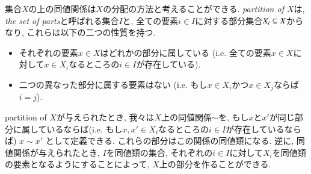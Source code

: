 \begin{example}[Partitions]\label{ex:partition}



集合$X$の上の同値関係は$X$の分配の方法と考えることができる. \emph{partition of $X$}は, \emph{the set of parts}と呼ばれる集合$I$と, 全ての要素$i\in I$に対する部分集合$X_i\ss X$からなり, これらは以下の二つの性質を持つ.
\begin{itemize}
\item それぞれの要素$x\in X$はどれかの部分に属している (i.e. 全ての要素$x\in X$に対して$x\in X_i$なるところの$i\in I$が存在している).
\item 二つの異なった部分に属する要素はない (i.e. もし$x\in X_i$かつ$x\in X_j$ならば$i=j$).
\end{itemize}

partition of $X$が与えられたとき, 我々は$X$上の同値関係$\sim$を, もし$x$と$x'$が同じ部分に属しているならば(i.e. もし$x,x'\in X_i$なるところの$i\in I$が存在しているならば) $x\sim x'$ として定義できる. これらの部分はこの関係の同値類になる. 逆に, 同値関係が与えられたとき, $I$を同値類の集合, それぞれの$i\in I$に対して$X_i$を同値類の要素となるようにすることによって, $X$上の部分を作ることができる.

\end{example}


